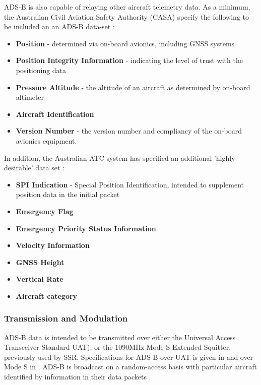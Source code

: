 ADS-B is also capable of relaying other aircraft telemetry data. As a minimum, the Australian Civil Aviation Safety Authority (CASA) specify the following to be included an an ADS-B data-set  \cite[Clause 8.2.3]{ADSB_AC_specs}:
\begin{itemize}
	\item \textbf{Position} - determined via on-board avionics, including GNSS systems
	\item\textbf{Position Integrity Information} - indicating the level of trust with the positioning data
	\item \textbf{Pressure Altitude} - the altitude of an aircraft as determined by on-board altimeter
	\item \textbf{Aircraft Identification}
	\item \textbf{Version Number} - the version number and compliancy of the on-board avionics equipment.
\end{itemize}
In addition, the Australian ATC system has specified an additional 'highly desirable' data set \cite[Clause 8.2.4]{ADSB_AC_specs}:
\begin{itemize}
	\item \textbf{SPI Indication} - Special Position Identification, intended to supplement position data in the initial packet
	\item \textbf{Emergency Flag}
	\item \textbf{Emergency Priority Status Information}
	\item \textbf{Velocity Information}
	\item \textbf{GNSS Height}
	\item \textbf{Vertical Rate}
	\item \textbf{Aircraft category}
\end{itemize}


\subsubsection{Transmission and Modulation}
ADS-B data is intended to be transmitted over either the Universal Access Transceiver Standard UAT), or the 1090MHz Mode S Extended Squitter, previously used by SSR. Specifications for ADS-B over UAT is given in \cite{RTCA_UAT} and over Mode S in \cite{RTCA_MODE_S}. ADS-B is broadcast on a random-access basis with particular aircraft identified by information in their data packets \cite{Blomenhofer2012}.

